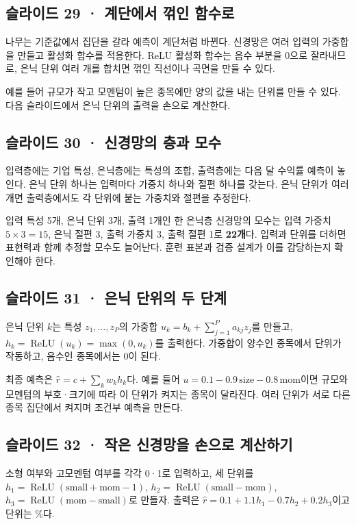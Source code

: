 \documentclass[11pt,a4paper]{article}
\begin{document}
\subsection{슬라이드 29 · 계단에서 꺾인 함수로}
나무는 기준값에서 집단을 갈라 예측이 계단처럼 바뀐다. 신경망은 여러 입력의 가중합을 만들고 활성화 함수를 적용한다. ReLU 활성화 함수는 음수 부분을 0으로 잘라내므로, 은닉 단위 여러 개를 합치면 꺾인 직선이나 곡면을 만들 수 있다.\par

예를 들어 규모가 작고 모멘텀이 높은 종목에만 양의 값을 내는 단위를 만들 수 있다. 다음 슬라이드에서 은닉 단위의 출력을 손으로 계산한다.\par

\subsection{슬라이드 30 · 신경망의 층과 모수}
입력층에는 기업 특성, 은닉층에는 특성의 조합, 출력층에는 다음 달 수익률 예측이 놓인다. 은닉 단위 하나는 입력마다 가중치 하나와 절편 하나를 갖는다. 은닉 단위가 여러 개면 출력층에서도 각 단위에 붙는 가중치와 절편을 추정한다.\par

입력 특성 5개, 은닉 단위 3개, 출력 1개인 한 은닉층 신경망의 모수는 입력 가중치 $5\times3=15$, 은닉 절편 3, 출력 가중치 3, 출력 절편 1로 \textbf{22개}다. 입력과 단위를 더하면 표현력과 함께 추정할 모수도 늘어난다. 훈련 표본과 검증 설계가 이를 감당하는지 확인해야 한다.\par

\subsection{슬라이드 31 · 은닉 단위의 두 단계}
은닉 단위 $k$는 특성 $z_1,\ldots,z_P$의 가중합 $u_k=b_k+\sum_{j=1}^{P}a_{kj}z_j$를 만들고, $h_k=\operatorname{ReLU}(u_k)=\max(0,u_k)$를 출력한다. 가중합이 양수인 종목에서 단위가 작동하고, 음수인 종목에서는 0이 된다.\par

최종 예측은 $\hat r=c+\sum_kw_kh_k$다. 예를 들어 $u=0.1-0.9\,\mathrm{size}-0.8\,\mathrm{mom}$이면 규모와 모멘텀의 부호·크기에 따라 이 단위가 켜지는 종목이 달라진다. 여러 단위가 서로 다른 종목 집단에서 켜지며 조건부 예측을 만든다.\par

\subsection{슬라이드 32 · 작은 신경망을 손으로 계산하기}
소형 여부와 고모멘텀 여부를 각각 0·1로 입력하고, 세 단위를 $h_1=\operatorname{ReLU}(\mathrm{small}+\mathrm{mom}-1)$, $h_2=\operatorname{ReLU}(\mathrm{small}-\mathrm{mom})$, $h_3=\operatorname{ReLU}(\mathrm{mom}-\mathrm{small})$로 만들자. 출력은 $\hat r=0.1+1.1h_1-0.7h_2+0.2h_3$이고 단위는 \%다.\par
\end{document}

